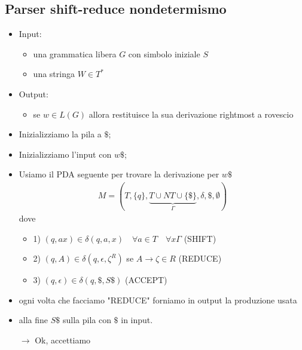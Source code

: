 \documentclass[a4paper,12pt]{article}
\begin{document}
{\subsection{Parser shift-reduce nondetermismo}
\begin{itemize}
  \item Input:
  \begin{itemize}
    \item una grammatica libera $G$ con simbolo iniziale $S$
    \item una stringa $W \in T^*$
  \end{itemize}
  \item Output:
    \begin{itemize}
    \item se $w \in L(G)$ allora restituisce la sua derivazione rightmost a rovescio
  \end{itemize}
\end{itemize}
\vspace{1em}
  \begin{itemize}
    \item Inizializziamo la pila a $\mathdollar$;
    \item Inizializziamo l'input con $w \mathdollar$;
    \item Usiamo il PDA seguente per trovare la derivazione per $w \mathdollar$
    \begin{align*}
      M = (T, \{q\}, \underbrace{T \cup NT \cup \{\mathdollar\}}_\Gamma, \delta, \mathdollar, \emptyset)
    \end{align*}
    dove 
    \begin{itemize}
      \item 1) $(q, ax) \in \delta(q, a, x) \quad \forall a \in T \quad \forall x \Gamma$ (SHIFT) 
      \item 2) $(q, A) \in \delta(q, \epsilon, \zeta^R)$ se $A \to \zeta \in R$ (REDUCE)
      \item 3) $(q, \epsilon) \in \delta(q, \mathdollar, S \mathdollar)$ (ACCEPT)
    \end{itemize}
    \item ogni volta che facciamo "REDUCE" forniamo in output la produzione usata
    \item alla fine $S \mathdollar$ sulla pila con $\mathdollar$ in input.
    \begin{center}
    $\to$ Ok, accettiamo
    \end{center}
  \end{itemize}
    \begin{center}

\end{center}}
\end{document}
